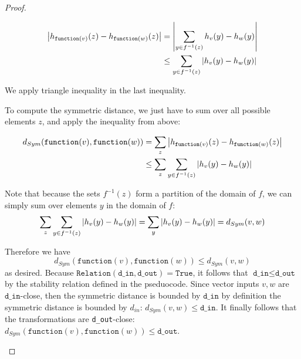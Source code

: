 \documentclass[11pt,a4paper]{article}
\newcommand{\din}{\texttt{d\_in}}
\newcommand{\dout}{\texttt{d\_out}}
\newcommand{\Relation}{\texttt{Relation}}
\newcommand{\function}{\texttt{function}}
\begin{document}
\begin{proof}
\begin{enumerate}
\begin{align*}
    \abs{h_{\texttt{function}(v)}(z) - h_{\texttt{function}(w)}(z)} &= \abs{\sum_{y \in f^{-1}(z)} h_v(y) - h_w(y)}\\
    &\leq \sum_{y \in f^{-1}(z)} \abs{h_v(y) - h_w(y)}
\end{align*}


We apply triangle inequality in the last inequality.

To compute the symmetric distance, we just have to sum over all possible elements $z$, and apply the inequality from above:

\begin{align*}
    d_{Sym}(\texttt{function}(v), \texttt{function}(w)) &= 
    \sum_z \abs{h_{\texttt{function}(v)}(z) - h_{\texttt{function}(w)}(z)} \\
    &\leq \sum_z \sum_{y \in f^{-1}(z)} \abs{h_v(y) - h_w(y)}\\
\end{align*}

Note that because the sets $f^{-1}(z)$ form a partition of the domain of $f$, we can simply sum over elements $y$ in the domain of $f$: $$\sum_z \sum_{y \in f^{-1}(z)} \abs{h_v(y) - h_w(y)} = \sum_y \abs{h_{v}(y) - h_{w}(y)} = d_{Sym}(v, w)$$

Therefore we have $$d_{Sym}(\texttt{function}(v), \texttt{function}(w)) \leq d_{Sym}(v, w)$$ as desired.
Because $\Relation(\din, \dout) = \texttt{True}$, it follows that $\din \leq \dout$ by the stability relation defined in the pseduocode. Since vector inputs $v, w$ are $\din$-close, then the symmetric distance is bounded by $\din$ by definition the symmetric distance is bounded by $d_{in}$: $d_{Sym}(v, w) \leq \din$. It finally follows that the transformations are \dout-close: $d_{Sym}(\function(v), \function(w)) \leq \dout$.
\end{enumerate}
\end{proof}
\end{document}
